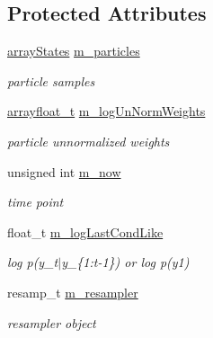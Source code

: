 \subsection*{Protected Attributes}
\begin{DoxyCompactItemize}
\item 
\mbox{\label{classBSFilterWC_abd332451e5d42093d95f2a8202220c7e}} 
\hyperlink{classBSFilterWC_af89dac8c324ae8b549595a85e89ec7da}{array\+States} \hyperlink{classBSFilterWC_abd332451e5d42093d95f2a8202220c7e}{m\+\_\+particles}
\begin{DoxyCompactList}\small\item\em particle samples \end{DoxyCompactList}\item 
\mbox{\label{classBSFilterWC_a1587d1370cb0ed304c6b7789e8b0230c}} 
\hyperlink{classBSFilterWC_a12c3f32cb628a0efaa0267262205d6d6}{arrayfloat\+\_\+t} \hyperlink{classBSFilterWC_a1587d1370cb0ed304c6b7789e8b0230c}{m\+\_\+log\+Un\+Norm\+Weights}
\begin{DoxyCompactList}\small\item\em particle unnormalized weights \end{DoxyCompactList}\item 
\mbox{\label{classBSFilterWC_a1cf44a2c240be863bc2c0b3cf21bae9b}} 
unsigned int \hyperlink{classBSFilterWC_a1cf44a2c240be863bc2c0b3cf21bae9b}{m\+\_\+now}
\begin{DoxyCompactList}\small\item\em time point \end{DoxyCompactList}\item 
\mbox{\label{classBSFilterWC_ad777a75d66ff91ab883824da57026a86}} 
float\+\_\+t \hyperlink{classBSFilterWC_ad777a75d66ff91ab883824da57026a86}{m\+\_\+log\+Last\+Cond\+Like}
\begin{DoxyCompactList}\small\item\em log p(y\+\_\+t$\vert$y\+\_\+\{1\+:t-\/1\}) or log p(y1) \end{DoxyCompactList}\item 
\mbox{\label{classBSFilterWC_a7cbf8d09b07e0f20b5c8a8f1f7f0590f}} 
resamp\+\_\+t \hyperlink{classBSFilterWC_a7cbf8d09b07e0f20b5c8a8f1f7f0590f}{m\+\_\+resampler}
\begin{DoxyCompactList}\small\item\em resampler object \end{DoxyCompactList}\item 

\end{DoxyCompactItemize}
